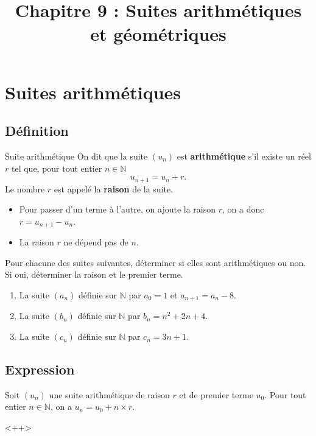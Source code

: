\documentclass[11pt]{article}
\title{Chapitre 9 : Suites arithmétiques et géométriques}
\date{}
\author{}
\begin{document}
\maketitle\thispagestyle{fancy}

\section{Suites arithmétiques}
\subsection{Définition}
\begin{defi}{Suite arithmétique}
  On dit que la suite $(u_n)$ est \textbf{arithmétique} s'il existe un réel
  $r$ tel que, pour tout entier $n\in\mathbb{N}$
  \[
    u_{n+1} = u_n + r.
  \]
  Le nombre $r$ est appelé la \textbf{raison} de la suite.
\end{defi}

\begin{rmq}
  \begin{itemize}
    \item Pour passer d'un terme à l'autre, on ajoute la raison $r$, on a donc
      $r=u_{n+1}-u_n$.
    \item La raison $r$ ne dépend pas de $n$.
  \end{itemize}
\end{rmq}

\begin{app}
  Pour chacune des suites suivantes, déterminer si elles sont arithmétiques ou
  non. Si oui, déterminer la raison et le premier terme.
  \begin{enumerate}
    \item La suite $(a_n)$ définie sur $\mathbb{N}$ par $a_0=1$ et
      $a_{n+1}=a_n-8$.
    \item La suite $(b_n)$ définie sur $\mathbb{N}$ par $b_n=n^2+2n+4$.
    \item La suite $(c_n)$ définie sur $\mathbb{N}$ par $c_n=3n+1$.
  \end{enumerate}
\end{app}

\subsection{Expression}
\begin{prop}
  Soit $(u_n)$ une suite arithmétique de raison $r$ et de premier terme $u_0$.
  Pour tout entier $n\in\mathbb{N}$, on a $u_n = u_0 +n\times r$.
\end{prop}<++>
\end{document}
